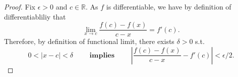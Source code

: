\documentclass[10pt]{article}
\begin{document}
\begin{proof}
    Fix $\epsilon > 0$ and $c \in\mathbb{R}.$ As $f$ is differentiable, we have by definition of differentiabliliy that
    \begin{equation*}
        \lim_{x\to c} \frac{f(c)-f(x)}{c-x} = f'(c).
    \end{equation*}
    Therefore, by definition of functional limit, there exists $\delta > 0$ s.t.
    \begin{equation} \label{eq:de2}
        0<|x-c|<\delta\qquad\textbf{ implies }\qquad\left |\frac{f(c)-f(x)}{c-x}-f'(c)\right |<\epsilon/2.
    \end{equation}


\end{proof}
\end{document}
